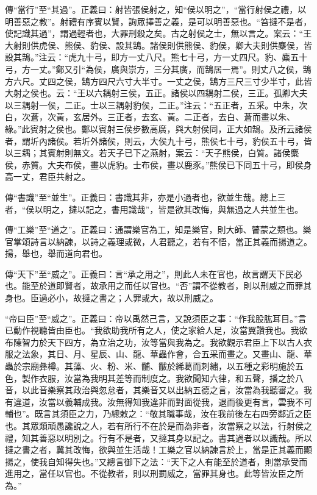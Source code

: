 {\noindent\zhuan{}\fzbyks 傳“當行”至“其過”。正義曰：射皆張侯射之，知“侯以明之”，“當行射侯之禮，以明善惡之教”。射禮有序賓以賢，詢眾擇善之義，是可以明善惡也。“笞撻不是者，使記識其過”，謂過輕者也，大罪刑殺之矣。古之射侯之士，無以言之。案云：“王大射則供虎侯、熊侯、豹侯、設其鵠。諸侯則供熊侯、豹侯，卿大夫則供麋侯，皆設其鵠。”注云：“虎九十弓，即方一丈八尺。熊七十弓，方一丈四尺。豹、麋五十弓，方一丈。”鄭又引“為侯，廣與崇方，三分其廣，而鵠居一焉”。則丈八之侯，鵠方六尺。丈四之侯，鵠方四尺六寸大半寸。一丈之侯，鵠方三尺三寸少半寸，此皆大射之侯也。云：“王以六耦射三侯，五正。諸侯以四耦射二侯，三正。孤卿大夫以三耦射一侯，二正。士以三耦射豹侯，二正。”注云：“五正者，五采。中朱，次白，次蒼，次黃，玄居外。三正者，去玄、黃。二正者，去白、蒼而畫以朱、綠。”此賓射之侯也。鄭以賓射三侯步數高廣，與大射侯同，正大如鵠。及所云諸侯者，謂圻內諸侯。若圻外諸侯，則云，大侯九十弓，熊侯七十弓，豹侯五十弓，皆以三耦；其賓射則無文。若天子已下之燕射，案云：“天子熊侯，白質。諸侯麋侯，赤質。大夫布侯，畫以虎豹。士布侯，畫以鹿豕。”熊侯已下同五十弓，即侯身高一丈，君臣共射之。 \par}

{\noindent\zhuan{}\fzbyks 傳“書識”至“並生”。正義曰：書識其非，亦是小過者也，欲並生哉。總上三者，“侯以明之，撻以記之，書用識哉”，皆是欲其改悔，與無過之人共並生也。 \par}

{\noindent\zhuan{}\fzbyks 傳“工樂”至“道之”。正義曰：通謂樂官為工，知是樂官，則大師、瞽蒙之類也。樂官掌頌詩言以納諫，以詩之義理或微，人君聽之，若有不悟，當正其義而揚道之。揚，舉也，舉而道向君也。 \par}

{\noindent\zhuan{}\fzbyks 傳“天下”至“威之”。正義曰：言“承之用之”，則此人未在官也，故言謂天下民必也。能至於道即賢者，故承用之而任以官也。“否”謂不從教者，則以刑威之而罪其身也。臣過必小，故撻之書之；人罪或大，故以刑威之。 \par}

{\noindent\shu{}\fzkt “帝曰臣”至“威之”。正義曰：帝以禹然己言，又說須臣之事：“作我股肱耳目。”言已動作視聽皆由臣也。“我欲助我所有之人，使之家給人足，汝當翼讚我也。我欲布陳智力於天下四方，為立治之功，汝等當與我為之。我欲觀示君臣上下以古人衣服之法象，其日、月、星辰、山、龍、華蟲作會，合五采而畫之。又畫山、龍、華蟲於宗廟彝樽。其藻、火、粉、米、黼、黻於絺葛而刺繡，以五種之彩明施於五色，製作衣服，汝當為我明其差等而制度之。我欲聞知六律，和五聲，播之於八音，以此音樂察其政治與忽怠者，其樂音又以出納五德之言，汝當為我聽審之。我有違道，汝當以義輔成我。汝無得知我違非而對面從我，退而後更有言，雲我不可輔也”。既言其須臣之力，乃總敕之：“敬其職事哉，汝在我前後左右四旁鄰近之臣也。其眾類頑愚讒說之人，若有所行不在於是而為非者，汝當察之以法，行射侯之禮，知其善惡以明別之。行有不是者，又撻其身以記之。書其過者以以識哉。所以撻之書之者，冀其改悔，欲與並生活哉！工樂之官以納諫言於上，當是正其義而顯揚之，使我自知得失也。”又總言御下之法：“天下之人有能至於道者，則當承受而進用之，當任以官也。不從教者，則以刑罰威之，當罪其身也。此等皆汝臣之所為。” \par}

